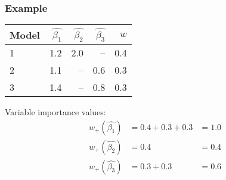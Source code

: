 \documentclass[color=usenames,dvipsnames]{beamer}\usepackage[]{graphicx}\usepackage[]{color}
\begin{document}
\begin{frame}
  \frametitle{Example}
  \begin{center}
    \begin{tabular}{lrrrr}
      \hline
      Model & $\hat{\beta_1}$ & $\hat{\beta_2}$ & $\hat{\beta_3}$ & $w$ \\
      \hline
      1 & 1.2 & 2.0 & --  & 0.4 \\
      2 & 1.1 & --  & 0.6 & 0.3 \\
      3 & 1.4 & --  & 0.8 & 0.3 \\
      \hline
    \end{tabular}
  \end{center}
  \pause
  Variable importance values:
  \begin{align*}
    w_+(\hat{\beta_1}) &= 0.4 + 0.3 + 0.3 &= 1.0 \\
    w_+(\hat{\beta_2}) &= 0.4             &= 0.4 \\
    w_+(\hat{\beta_3}) &= 0.3 + 0.3       &= 0.6
  \end{align*}
\end{frame}






















\end{document}
